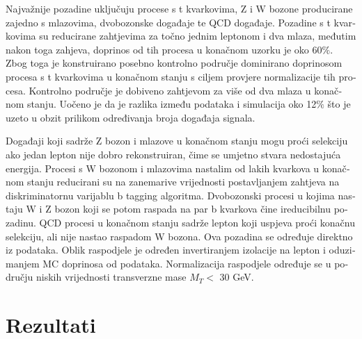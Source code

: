 \begin{otherlanguage}{croatian}
Najvažnije pozadine uključuju procese s t kvarkovima, Z i W bozone producirane zajedno s mlazovima, dvobozonske događaje te QCD događaje. Pozadine s t kvarkovima su reducirane zahtjevima za točno jednim leptonom i dva mlaza, međutim nakon toga zahjeva, doprinos od tih procesa u konačnom uzorku je oko 60$\%$. Zbog toga je konstruirano posebno kontrolno područje dominirano doprinosom procesa s t kvarkovima u konačnom stanju s ciljem provjere normalizacije tih procesa. Kontrolno područje je dobiveno zahtjevom za više od dva mlaza u konačnom stanju. Uočeno je da je razlika između podataka i simulacija oko 12$\%$ što je uzeto u obzit prilikom određivanja broja događaja signala. 
\par Događaji koji sadrže Z bozon i mlazove u konačnom stanju mogu proći selekciju ako jedan lepton nije dobro rekonstruiran, čime se umjetno stvara nedostajuća energija. Procesi s W bozonom i mlazovima nastalim od lakih kvarkova u konačnom stanju reducirani su na zanemarive vrijednosti postavljanjem zahtjeva na diskriminatornu varijablu b tagging algoritma. Dvobozonski procesi u kojima nastaju W i Z bozon koji se potom raspada na par b kvarkova čine ireducibilnu pozadinu. QCD procesi u konačnom stanju sadrže lepton koji uspjeva proći konačnu selekciju, ali nije nastao raspadom W bozona. Ova pozadina se određuje direktno iz podataka. Oblik raspodjele je određen invertiranjem izolacije na lepton i oduzimanjem MC doprinosa od podataka. Normalizacija raspodjele određuje se u području niskih vrijednosti transverzne mase $M_T<$ 30 GeV.

\section{Rezultati}


\end{otherlanguage}
